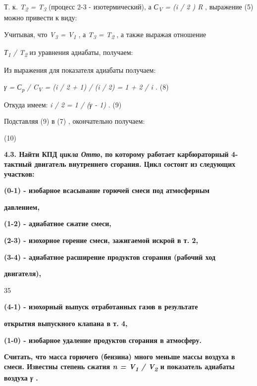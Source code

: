 Т. к. \emph{T\textsubscript{2} = T\textsubscript{3}} (процесс 2-3 -
изотермический), а \emph{С\textsubscript{V} = (i / 2 ) R} , выражение
(5) можно привести к виду:


Учитывая, что \emph{V\textsubscript{3} = V\textsubscript{1}} , а
\emph{T\textsubscript{3} = T\textsubscript{2}} , а также выражая
отношение

\emph{Т\textsubscript{1} / T\textsubscript{2}} из уравнения адиабаты,
получаем:


Из выражения для показателя адиабаты получаем:

\emph{γ = С\textsubscript{p} / C\textsubscript{V} = (i / 2 + 1) / (i /
2) = 1 + 2 / i .} (8)

Откуда имеем: \emph{i / 2 = 1 / (γ - 1)} . (9)

Подставляя (9) в (7) , окончательно получаем:

(10)

\textbf{4.3. Найти КПД \emph{цикла Отто}, по которому работает
карбюраторный 4-тактный двигатель внутреннего сгорания. Цикл состоит из
следующих участков:}

\textbf{(0-1) - изобарное всасывание горючей смеси под атмосферным}

\textbf{давлением,}

\textbf{(1-2) - адиабатное сжатие смеси,}

\textbf{(2-3) - изохорное горение смеси, зажигаемой искрой в т. 2,}

\textbf{(3-4) - адиабатное расширение продуктов сгорания (рабочий ход}

\textbf{двигателя),}

35

\textbf{(4-1) - изохорный выпуск отработанных газов в результате}

\textbf{открытия выпускного клапана в т. 4,}

\textbf{(1-0) - изобарное удаление продуктов сгорания в атмосферу.}

\textbf{Считать, что масса горючего (бензина) много меньше массы воздуха
в смеси. Известны степень сжатия \emph{n = V\textsubscript{1} /
V\textsubscript{2}} и показатель адиабаты воздуха \emph{γ} .}


